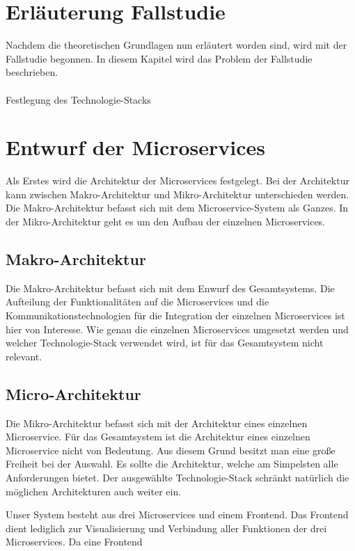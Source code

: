 \section{Erläuterung Fallstudie}

Nachdem die theoretischen Grundlagen nun erläutert worden sind, wird mit der Fallstudie begonnen. In diesem Kapitel wird das Problem der Fallstudie beschrieben. \\
\\
Festlegung des Technologie-Stacks

\section{Entwurf der Microservices}

Als Erstes wird die Architektur der Microservices festgelegt. Bei der Architektur kann zwischen Makro-Architektur und Mikro-Architektur unterschieden werden. Die Makro-Architektur befasst sich mit dem Microservice-System als Ganzes. In der Mikro-Architektur geht es um den Aufbau der einzelnen Microservices.

\subsection{Makro-Architektur}

Die Makro-Architektur befasst sich mit dem Enwurf des Gesamtsystems. Die Aufteilung der Funktionalitäten auf die Microservices und die Kommunikationstechnologien für die Integration der einzelnen Microservices ist hier von Interesse. Wie genau die einzelnen Microservices umgesetzt werden und welcher Technologie-Stack verwendet wird, ist für das Gesamtsystem nicht relevant.

\subsection{Micro-Architektur}

Die Mikro-Architektur befasst sich mit der Architektur eines einzelnen Microservice. Für das Gesamtsystem ist die Architektur eines einzelnen Microservice nicht von Bedeutung. Aus diesem Grund besitzt man eine große Freiheit bei der Auswahl. Es sollte die Architektur, welche am Simpelsten alle Anforderungen bietet. Der ausgewählte Technologie-Stack schränkt natürlich die möglichen Architekturen auch weiter ein.

Unser System besteht aus drei Microservices und einem Frontend. Das Frontend dient lediglich zur Visualisierung und Verbindung aller Funktionen der drei Microservices. Da eine Frontend 


